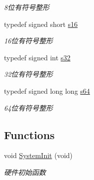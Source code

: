 \begin{DoxyCompactItemize}
\begin{DoxyCompactList}\small\item\em 8位有符号整形 \end{DoxyCompactList}\item 
\hypertarget{group___b_s_p_ga5ffa4f640862b25ba6d4f635b78bdbe1}{typedef signed short \hyperlink{group___b_s_p_ga5ffa4f640862b25ba6d4f635b78bdbe1}{s16}}\label{group___b_s_p_ga5ffa4f640862b25ba6d4f635b78bdbe1}

\begin{DoxyCompactList}\small\item\em 16位有符号整形 \end{DoxyCompactList}\item 
\hypertarget{group___b_s_p_ga0ce6887c26c1c49ad3be5710dd42bfd6}{typedef signed int \hyperlink{group___b_s_p_ga0ce6887c26c1c49ad3be5710dd42bfd6}{s32}}\label{group___b_s_p_ga0ce6887c26c1c49ad3be5710dd42bfd6}

\begin{DoxyCompactList}\small\item\em 32位有符号整形 \end{DoxyCompactList}\item 
\hypertarget{group___b_s_p_ga4258bfb2c3a440d06c4aaa3c2b450dde}{typedef signed long long \hyperlink{group___b_s_p_ga4258bfb2c3a440d06c4aaa3c2b450dde}{s64}}\label{group___b_s_p_ga4258bfb2c3a440d06c4aaa3c2b450dde}

\begin{DoxyCompactList}\small\item\em 64位有符号整形 \end{DoxyCompactList}\end{DoxyCompactItemize}
\subsection*{\-Functions}
\begin{DoxyCompactItemize}
\item 
void \hyperlink{group___b_s_p_ga93f514700ccf00d08dbdcff7f1224eb2}{\-System\-Init} (void)
\begin{DoxyCompactList}\small\item\em 硬件初始函数 \end{DoxyCompactList}\end{DoxyCompactItemize}


